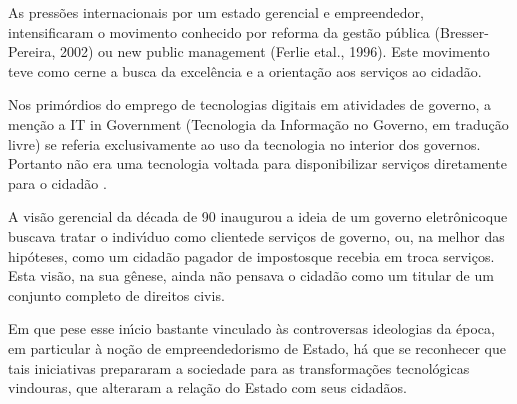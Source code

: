 \documentclass[
12pt,		%
openright,	%
twoside,  %
a4paper,			%
chapter=TITLE,		%
english,			%
french,				%
spanish,			%
brazil				%
]{USPSC-classe/USPSC}
\begin{document}
As press\~oes internacionais por um estado \textquotedbl gerencial e empreendedor, intensificaram o movimento conhecido por reforma da gest\~ao p\'ublica (Bresser-Pereira, 2002) ou new public management (Ferlie etal., 1996). Este movimento teve como cerne a \textquotedbl busca da excel\^encia e a orienta\c{c}\~ao aos servi\c{c}os ao cidad\~ao.

















Nos prim\'ordios do emprego de tecnologias digitais em atividades de governo, a men\c{c}\~ao a \textquotedbl IT in Government (\textquotedbl Tecnologia da Informa\c{c}\~ao no Governo, em tradu\c{c}\~ao livre) se referia exclusivamente ao uso da tecnologia no interior dos governos. Portanto n\~ao era uma tecnologia voltada para disponibilizar servi\c{c}os diretamente para o cidad\~ao .

















A vis\~ao gerencial da d\'ecada de 90 inaugurou a ideia de um \textquotedbl governo eletr\^onico\textquotedbl  que buscava tratar o indiv\'{\i}duo como \textquotedbl cliente\textquotedbl  de servi\c{c}os de governo, ou, na melhor das hip\'oteses, como um cidad\~ao \textquotedbl pagador de impostos\textquotedbl  que recebia em troca servi\c{c}os. Esta vis\~ao, na sua g\^enese, ainda n\~ao pensava o cidad\~ao como um titular de um conjunto completo de direitos civis.

















Em que pese esse in\'{\i}cio bastante vinculado \`as controversas ideologias da \'epoca, em particular \`a no\c{c}\~ao de \textquotedbl empreendedorismo de Estado\textquotedbl , h\'a que se reconhecer que tais iniciativas prepararam a sociedade para as transforma\c{c}\~oes tecnol\'ogicas vindouras, que alteraram a rela\c{c}\~ao do Estado com seus cidad\~aos.
\end{document}
